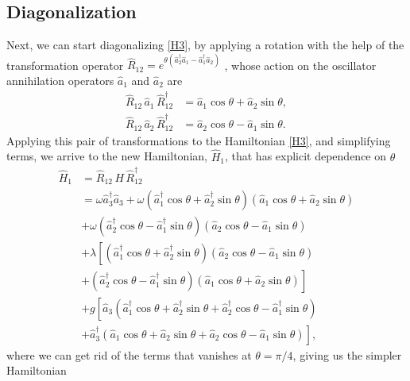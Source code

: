 \documentclass{article}
\newcommand{\op}[1]{\hat{#1}}
\begin{document}
\subsection{Diagonalization}\label{sec:diag}
Next, we can start diagonalizing \eqref{H3}, by applying a rotation with the help of the transformation operator $\op{R}_{12}=e^{\theta\left(\op{a}_{2}^{\dagger}\op{a}_{1}-\op{a}_{1}^{\dagger}\op{a}_2\right)}$ \cite{Urzua2019}, whose action on the oscillator annihilation operators $\op{a}_{1}$ and $\op{a}_{2}$ are
\begin{align*}
    \op{R}_{12}\, \op{a}_{1}\, \op{R}_{12}^{\dagger} &= \op{a}_{1}\cos\theta + \op{a}_{2}\sin\theta, \\
    \op{R}_{12}\, \op{a}_{2}\, \op{R}_{12}^{\dagger} &= \op{a}_{2}\cos\theta - \op{a}_{1}\sin\theta.
\end{align*}
Applying this pair of transformations to the  Hamiltonian \eqref{H3}, and simplifying terms, we arrive to the new Hamiltonian, $\op{H}_{1}$, that has explicit dependence on $\theta$ 
\begin{align*}
    \op{H}_{1} &= \op{R}_{12}\, H\, \op{R}_{12}^{\dagger}\\ 
    &= \omega \op{a}_{3}^{\dagger}\op{a}_{3} + \omega\left(\op{a}_{1}^{\dagger}\cos\theta + \op{a}_{2}^{\dagger}\sin\theta\right)\left(\op{a}_{1}\cos\theta + \op{a}_{2}\sin\theta\right)\\
    &+ \omega\left(\op{a}_{2}^{\dagger}\cos\theta -  \op{a}_{1}^{\dagger}\sin\theta\right)\left(\op{a}_2\cos\theta - \op{a}_1\sin\theta\right)\\
    &+ \lambda\left[\left(\op{a}_{1}^{\dagger}\cos\theta + \op{a}_{2}^{\dagger}\sin\theta\right)\left(\op{a}_{2}\cos\theta - \op{a}_{1}\sin\theta\right)\right.\\
    &+ \left.\left(\op{a}_2^{\dagger}\cos\theta - \op{a}_{1}^{\dagger}\sin\theta\right)\left(\op{a}_{1}\cos\theta + \op{a}_{2}\sin\theta\right)\right]\\
    &+ g\left[\op{a}_{3}\left(\op{a}_{1}^{\dagger}\cos\theta + \op{a}_{2}^{\dagger}\sin\theta + \op{a}_{2}^{\dagger}\cos\theta - \op{a}_{1}^{\dagger}\sin\theta\right)\right.\\
    &+ \left. \op{a}_{3}^{\dagger}\left(\op{a}_{1}\cos\theta + \op{a}_{2}\sin\theta + \op{a}_{2}\cos\theta - \op{a}_{1}\sin\theta\right)\right],
\end{align*}
where we can get rid of the terms that vanishes at $\theta=\pi/4$, giving us the simpler Hamiltonian
\end{document}
